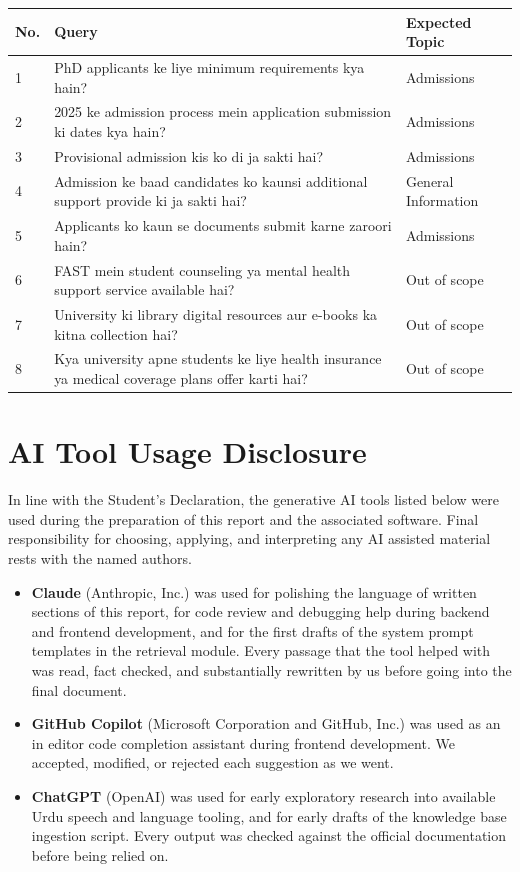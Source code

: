 \documentclass[12pt,a4paper]{report}
\begin{document}
\begin{longtable}{p{1cm} p{8cm} p{4cm}}
  \toprule
  \textbf{No.} & \textbf{Query} & \textbf{Expected Topic} \\
  \midrule
  \endhead
  1  & PhD applicants ke liye minimum requirements kya hain? & Admissions \\
  2  & 2025 ke admission process mein application submission ki dates kya hain? & Admissions \\
  3  & Provisional admission kis ko di ja sakti hai? & Admissions \\
  4  & Admission ke baad candidates ko kaunsi additional support provide ki ja sakti hai? & General Information \\
  5  & Applicants ko kaun se documents submit karne zaroori hain? & Admissions \\
  6  & FAST mein student counseling ya mental health support service available hai? & Out of scope \\
  7  & University ki library digital resources aur e-books ka kitna collection hai? & Out of scope \\
  8  & Kya university apne students ke liye health insurance ya medical coverage plans offer karti hai? & Out of scope \\
  \bottomrule
\end{longtable}

\section{AI Tool Usage Disclosure}
\label{app:ai-disclosure}

In line with the Student's Declaration, the generative AI tools listed
below were used during the preparation of this report and the
associated software. Final responsibility for choosing, applying, and
interpreting any AI assisted material rests with the named authors.

\begin{itemize}
  \item \textbf{Claude} (Anthropic, Inc.) was used for polishing the
        language of written sections of this report, for code review
        and debugging help during backend and frontend development, and
        for the first drafts of the system prompt templates in the
        retrieval module. Every passage that the tool helped with was
        read, fact checked, and substantially rewritten by us before
        going into the final document.
  \item \textbf{GitHub Copilot} (Microsoft Corporation and GitHub,
        Inc.) was used as an in editor code completion assistant during
        frontend development. We accepted, modified, or rejected each
        suggestion as we went.
  \item \textbf{ChatGPT} (OpenAI) was used for early exploratory
        research into available Urdu speech and language tooling, and
        for early drafts of the knowledge base ingestion script. Every
        output was checked against the official documentation before
        being relied on.
\end{itemize}
\end{document}

